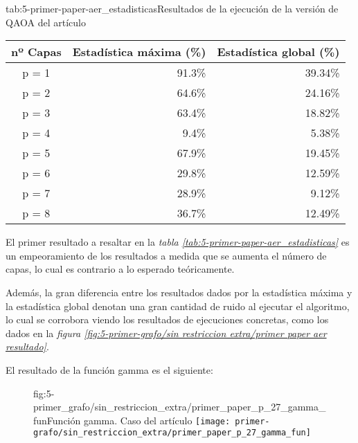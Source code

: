 \begin{table}[htbp]{tab:5-primer-paper-aer_estadisticas}{Resultados de la ejecución de la versión de QAOA del artículo}
  \centering
  \begin{tabular}{|c|r|r|}
    \hline
    \textbf{nº Capas} & \textbf{Estadística máxima (\%)} & \textbf{Estadística global (\%)} \\ \hline
    p = 1             & 91.3\%                           & 39.34\%                          \\ \hline
    p = 2             & 64.6\%                           & 24.16\%                          \\ \hline
    p = 3             & 63.4\%                           & 18.82\%                          \\ \hline
    p = 4             &  9.4\%                           &  5.38\%                          \\ \hline
    p = 5             & 67.9\%                           & 19.45\%                          \\ \hline
    p = 6             & 29.8\%                           & 12.59\%                          \\ \hline
    p = 7             & 28.9\%                           &  9.12\%                          \\ \hline
    p = 8             & 36.7\%                           & 12.49\%                          \\ \hline
  \end{tabular}
\end{table}

El primer resultado a resaltar en la \textit{tabla \ref{tab:5-primer-paper-aer_estadisticas}} es un empeoramiento de los resultados a medida que se aumenta el número de capas, lo cual es contrario a lo esperado teóricamente.

Además, la gran diferencia entre los resultados dados por la estadística máxima y la estadística global denotan una gran cantidad de ruido al ejecutar el algoritmo, lo cual se corrobora viendo los resultados de ejecuciones concretas, como los dados en la \textit{figura \ref{fig:5-primer-grafo/sin restriccion extra/primer paper aer resultado}}.

El resultado de la función gamma es el siguiente:
\begin{figure}[htbp]{fig:5-primer_grafo/sin_restriccion_extra/primer_paper_p_27_gamma_fun}{Función gamma. Caso del artículo}
  \centering
  \texttt{[image: primer-grafo/sin\_restriccion\_extra/primer\_paper\_p\_27\_gamma\_fun]}
\end{figure}

